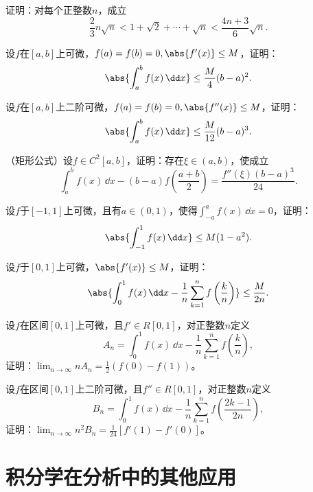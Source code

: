 \begin{xexercise}[5]
证明：对每个正整数$n$，成立
  \[
    \frac23n\sqrt n<1+\sqrt2+\cdots+\sqrt n<\frac{4n+3}{6}\sqrt n.
  \]
\end{xexercise}

\begin{xexercise}[6]
设$f$在$[a,b]$上可微，$f(a)=f(b)=0,\abs{f'(x)}\le M$，证明：
  \[
    \abs{\int_a^bf(x)\,\dd x}\le\frac M4(b-a)^2.
  \]
\end{xexercise}

\begin{xexercise}[7]
设$f$在$[a,b]$上二阶可微，$f(a)=f(b)=0,\abs{f''(x)}\le M$，证明：
  \[
    \abs{\int_a^bf(x)\,\dd x}\le\frac M{12}(b-a)^3.
  \]
\end{xexercise}

\begin{xexercise}[8]
（矩形公式）设$f\in C^2[a,b]$，证明：存在$\xi\in(a,b)$，使成立
  \[
    \int_a^bf(x)\,\dd x-(b-a)f\left(\frac{a+b}{2}\right)=\frac{f''(\xi)(b-a)^3}{24}.
  \]
\end{xexercise}

\begin{xexercise}[9]
设$f$于$[-1,1]$上可微，且有$a\in(0,1)$，使得$\int_{-a}^af(x)\,\dd x=0$，证明：
  \[
    \abs{\int_{-1}^1f(x)\,\dd x}\le M(1-a^2).
  \]
\end{xexercise}

\begin{xexercise}[10]
设$f$于$[0,1]$上可微，$\abs{f'(x)}\le M$，证明：
  \[
    \abs{\int_0^1f(x)\,\dd x-\frac1n\sum_{k=1}^nf\left(\frac kn\right)}\le\frac M{2n}.
  \]
\end{xexercise}

\begin{xexercise}[11]
设$f$在区间$[0,1]$上可微，且$f'\in R[0,1]$，对正整数$n$定义
  \[
    A_n=\int_0^1f(x)\,\dd x-\frac1n\sum_{k=1}^nf\left(\frac kn\right),
  \]
  证明：$\displaystyle\lim_{n\to\infty}nA_n=\frac12(f(0)-f(1))$。
\end{xexercise}

\begin{xexercise}[12]
设$f$在区间$[0,1]$上二阶可微，且$f''\in R[0,1]$，对正整数$n$定义
  \[
    B_n=\int_0^1f(x)\,\dd x-\frac1n\sum_{k=1}^nf\left(\frac{2k-1}{2n}\right),
  \]
  证明：$\displaystyle\lim_{n\to\infty}n^2B_n=\frac1{24}[f'(1)-f'(0)]$。
\end{xexercise}

\section{积分学在分析中的其他应用}

